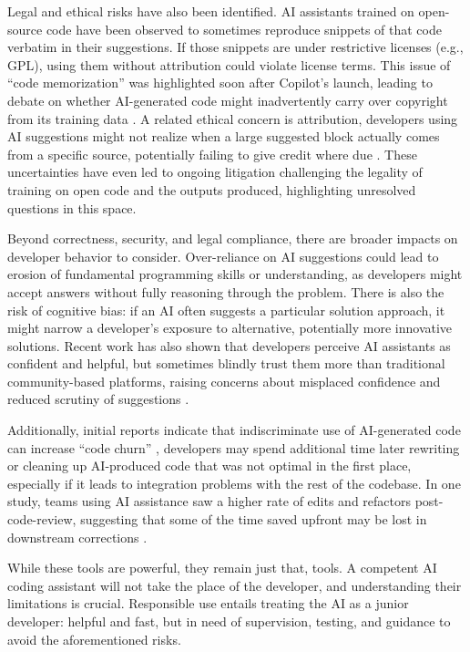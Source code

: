 Legal and ethical risks have also been identified. \gls{AI} assistants trained on open-source code have been observed to sometimes reproduce snippets of that code verbatim in their suggestions. If those snippets are under restrictive licenses (e.g., GPL), using them without attribution could violate license terms. This issue of ``code memorization'' was highlighted soon after Copilot’s launch, leading to debate on whether \gls{AI}-generated code might inadvertently carry over copyright from its training data \autocite{Sandoval2022}. A related ethical concern is attribution, developers using \gls{AI} suggestions might not realize when a large suggested block actually comes from a specific source, potentially failing to give credit where due \autocite{Xu2024}. These uncertainties have even led to ongoing litigation challenging the legality of training on open code and the outputs produced, highlighting unresolved questions in this space.

Beyond correctness, security, and legal compliance, there are broader impacts on developer behavior to consider. Over-reliance on \gls{AI} suggestions could lead to erosion of fundamental programming skills or understanding, as developers might accept answers without fully reasoning through the problem. There is also the risk of cognitive bias: if an \gls{AI} often suggests a particular solution approach, it might narrow a developer’s exposure to alternative, potentially more innovative solutions. Recent work has also shown that developers perceive \gls{AI} assistants as confident and helpful, but sometimes blindly trust them more than traditional community-based platforms, raising concerns about misplaced confidence and reduced scrutiny of suggestions \autocite{Li2023QA}.

Additionally, initial reports indicate that indiscriminate use of \gls{AI}-generated code can increase ``code churn'' ,  developers may spend additional time later rewriting or cleaning up \gls{AI}-produced code that was not optimal in the first place, especially if it leads to integration problems with the rest of the codebase. In one study, teams using \gls{AI} assistance saw a higher rate of edits and refactors post-code-review, suggesting that some of the time saved upfront may be lost in downstream corrections \autocite{GitClear2024Copilot}.

While these tools are powerful, they remain just that, tools. A competent \gls{AI} coding assistant will not take the place of the developer, and understanding their limitations is crucial. Responsible use entails treating the \gls{AI} as a junior developer: helpful and fast, but in need of supervision, testing, and guidance to avoid the aforementioned risks.

